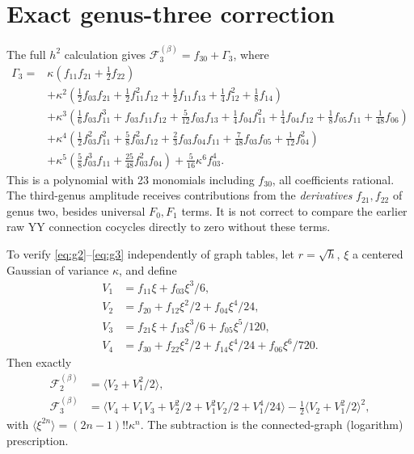 \documentclass[11pt,letterpaper]{article}
\begin{document}
\section{Exact genus-three correction}
The full $h^2$ calculation gives $\mathcal F_3^{(\beta)}=f_{30}+\Gamma_3$, where
\begin{align}
\Gamma_3={}&\kappa\left(f_{11}f_{21}+\frac12 f_{22}\right)\nonumber\\
&+\kappa^2\left(\frac12 f_{03}f_{21}+\frac12f_{11}^2f_{12}+\frac12f_{11}f_{13}+\frac14f_{12}^2+\frac18 f_{14}\right)\nonumber\\
&+\kappa^3\left(\frac16f_{03}f_{11}^3+f_{03}f_{11}f_{12}+\frac5{12}f_{03}f_{13}
 +\frac14f_{04}f_{11}^2+\frac14f_{04}f_{12}+\frac18f_{05}f_{11}+\frac1{48}f_{06}\right)\nonumber\\
&+\kappa^4\left(\frac12f_{03}^2f_{11}^2+\frac58 f_{03}^2f_{12}+\frac23f_{03}f_{04}f_{11}
+\frac7{48}f_{03}f_{05}+\frac1{12}f_{04}^2\right)\nonumber\\
&+\kappa^5\left(\frac58 f_{03}^3f_{11}+\frac{25}{48}f_{03}^2f_{04}\right)
+\frac5{16}\kappa^6 f_{03}^4.
\label{eq:g3}
\end{align}
This is a polynomial with 23 monomials including $f_{30}$, all coefficients rational. The third-genus amplitude receives contributions from the \emph{derivatives} $f_{21},f_{22}$ of genus two, besides universal $F_0,F_1$ terms. It is not correct to compare the earlier raw YY connection cocycles directly to zero without these terms.

To verify \eqref{eq:g2}--\eqref{eq:g3} independently of graph tables, let $r=\sqrt h$, $\xi$ a centered Gaussian of variance $\kappa$, and define
\begin{align*}
V_1&=f_{11}\xi+f_{03}\xi^3/6,\\
V_2&=f_{20}+f_{12}\xi^2/2+f_{04}\xi^4/24,\\
V_3&=f_{21}\xi+f_{13}\xi^3/6+f_{05}\xi^5/120,\\
V_4&=f_{30}+f_{22}\xi^2/2+f_{14}\xi^4/24+f_{06}\xi^6/720.
\end{align*}
Then exactly
\begin{align}
\mathcal F_2^{(\beta)}&=\langle V_2+V_1^2/2\rangle,\\
\mathcal F_3^{(\beta)}&=\big\langle V_4+V_1V_3+V_2^2/2+V_1^2V_2/2+V_1^4/24\big\rangle
-\frac12\langle V_2+V_1^2/2\rangle^2,
\end{align}
with $\langle\xi^{2n}\rangle=(2n-1)!!\kappa^n$. The subtraction is the connected-graph (logarithm) prescription.
\end{document}
